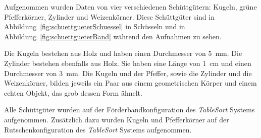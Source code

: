 


Aufgenommen wurden Daten von vier verschiedenen Schüttgütern: Kugeln, grüne Pfefferkörner, Zylinder und Weizenkörner.
Diese Schüttgüter sind in Abbildung~\ref{fig:schuettgueterSchuessel} in Schüsseln 
und in Abbildung~\ref{fig:schuettgueterBand} während den Aufnahmen zu sehen.



Die Kugeln bestehen aus Holz und haben einen Durchmesser von \SI{5}{\milli\metre}.
Die Zylinder bestehen ebenfalls aus Holz. Sie haben eine Länge von \SI{1}{\centi\metre} und einen Durchmesser von \SI{3}{\milli\metre}.
Die Kugeln und der Pfeffer, sowie die Zylinder und die Weizenkörner, bilden jeweils 
ein Paar aus einem geometrischen Körper und einem echten Objekt, das grob dessen Form ähnelt.


Alle Schüttgüter wurden auf der Förderbandkonfiguration des \textit{TableSort} Systems aufgenommen.
Zusätzlich dazu wurden Kugeln und Pfefferkörner auf der Rutschenkonfiguration des \textit{TableSort} Systems aufgenommen.

